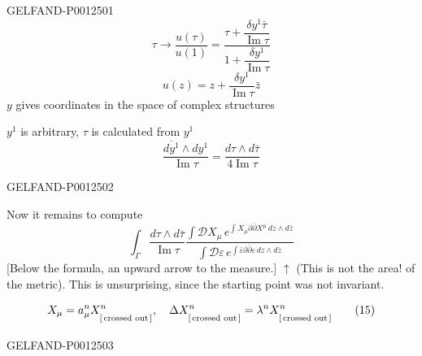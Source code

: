 \begin{GelfandAdjacentEvidence}{GELFAND-P001250}{1}
\begin{equation*}
\tau\longrightarrow\frac{u(\tau)}{u(1)}
=\frac{\tau+\dfrac{\delta y^1\bar\tau}{\operatorname{Im}\tau}}
{1+\dfrac{\delta y^1}{\operatorname{Im}\tau}}\tag{12}
\end{equation*}
\begin{equation*}
u(z)=z+\frac{\delta y^1}{\operatorname{Im}\tau}\bar z\tag{13}
\end{equation*}
$y$ gives coordinates in the space of complex structures

$y^1$ is arbitrary, $\tau$ is calculated from $y^1$
\begin{equation*}
\frac{\overline{dy^1}\wedge dy^1}{\operatorname{Im}\tau}
=\frac{d\tau\wedge d\bar\tau}{4\operatorname{Im}\tau}
\end{equation*}
\end{GelfandAdjacentEvidence}
\begin{GelfandAdjacentEvidence}{GELFAND-P001250}{2}


Now it remains to compute
\begin{equation*}
\int_{\Gamma}\frac{d\tau\wedge d\bar\tau}{\operatorname{Im}\tau}
\frac{\int\mathcal D X_{\mu}\,e^{\int X_{\mu}\partial\bar\partial X^{\mu}\,dz\wedge d\bar z}}
{\int\mathcal D\varepsilon\,e^{\int\bar\varepsilon\partial\bar\partial\varepsilon\,dz\wedge d\bar z}}\tag{14}
\end{equation*}
[Below the formula, an upward arrow to the measure.] $\uparrow$ (This is not the area! of the metric).
This is unsurprising, since the starting point was not invariant.

\begin{equation*}
X_{\mu}=a_{\mu}^n X^n_{\text{[\,\strut{}crossed out\,]}},
\quad \Delta X^n_{\text{[\,\strut{}crossed out\,]}}
=\lambda^n X^n_{\text{[\,\strut{}crossed out\,]}}\tag{15}
\end{equation*}
\end{GelfandAdjacentEvidence}
\begin{GelfandAdjacentEvidence}{GELFAND-P001250}{3}

\end{GelfandAdjacentEvidence}
